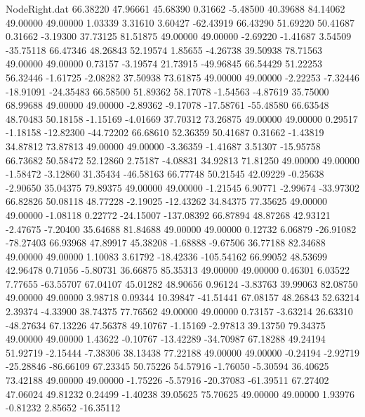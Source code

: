 \begin{filecontents}{NodeRight.dat}
  66.38220   47.96661   45.68390     0.31662   -5.48500   40.39688   84.14062   49.00000   49.00000    1.03339    3.31610    3.60427  -62.43919
  66.43290   51.69220   50.41687     0.31662   -3.19300   37.73125   81.51875   49.00000   49.00000   -2.69220   -1.41687    3.54509  -35.75118
  66.47346   48.26843   52.19574     1.85655   -4.26738   39.50938   78.71563   49.00000   49.00000    0.73157   -3.19574   21.73915  -49.96845
  66.54429   51.22253   56.32446    -1.61725   -2.08282   37.50938   73.61875   49.00000   49.00000   -2.22253   -7.32446  -18.91091  -24.35483
  66.58500   51.89362   58.17078    -1.54563   -4.87619   35.75000   68.99688   49.00000   49.00000   -2.89362   -9.17078  -17.58761  -55.48580
  66.63548   48.70483   50.18158    -1.15169   -4.01669   37.70312   73.26875   49.00000   49.00000    0.29517   -1.18158  -12.82300  -44.72202
  66.68610   52.36359   50.41687     0.31662   -1.43819   34.87812   73.87813   49.00000   49.00000   -3.36359   -1.41687    3.51307  -15.95758
  66.73682   50.58472   52.12860     2.75187   -4.08831   34.92813   71.81250   49.00000   49.00000   -1.58472   -3.12860   31.35434  -46.58163
  66.77748   50.21545   42.09229    -0.25638   -2.90650   35.04375   79.89375   49.00000   49.00000   -1.21545    6.90771   -2.99674  -33.97302
  66.82826   50.08118   48.77228    -2.19025  -12.43262   34.84375   77.35625   49.00000   49.00000   -1.08118    0.22772  -24.15007 -137.08392
  66.87894   48.87268   42.93121    -2.47675   -7.20400   35.64688   81.84688   49.00000   49.00000    0.12732    6.06879  -26.91082  -78.27403
  66.93968   47.89917   45.38208    -1.68888   -9.67506   36.77188   82.34688   49.00000   49.00000    1.10083    3.61792  -18.42336 -105.54162
  66.99052   48.53699   42.96478     0.71056   -5.80731   36.66875   85.35313   49.00000   49.00000    0.46301    6.03522    7.77655  -63.55707
  67.04107   45.01282   48.90656     0.96124   -3.83763   39.99063   82.08750   49.00000   49.00000    3.98718    0.09344   10.39847  -41.51441
  67.08157   48.26843   52.63214     2.39374   -4.33900   38.74375   77.76562   49.00000   49.00000    0.73157   -3.63214   26.63310  -48.27634
  67.13226   47.56378   49.10767    -1.15169   -2.97813   39.13750   79.34375   49.00000   49.00000    1.43622   -0.10767  -13.42289  -34.70987
  67.18288   49.24194   51.92719    -2.15444   -7.38306   38.13438   77.22188   49.00000   49.00000   -0.24194   -2.92719  -25.28846  -86.66109
  67.23345   50.75226   54.57916    -1.76050   -5.30594   36.40625   73.42188   49.00000   49.00000   -1.75226   -5.57916  -20.37083  -61.39511
  67.27402   47.06024   49.81232     0.24499   -1.40238   39.05625   75.70625   49.00000   49.00000    1.93976   -0.81232    2.85652  -16.35112

\end{filecontents}
